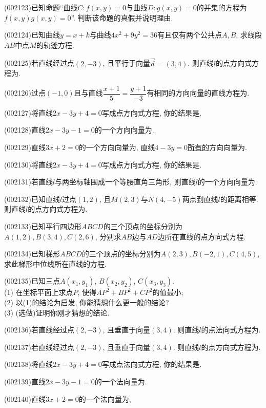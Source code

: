 \item (002123)已知命题``曲线$C:f(x,y)=0$与曲线$D:g(x,y)=0$的并集的方程为$f(x,y)g(x,y)=0$''. 判断该命题的真假并说明理由.
\item (002124)已知曲线$y=x+k$与曲线$4x^2+9y^2=36$有且仅有两个公共点$A,B$, 求线段$AB$中点$M$的轨迹方程.
\item (002125)若直线经过点$(2,-3)$, 且平行于向量$\overrightarrow{d}=(3,4)$. 则直线$l$的点方向式方程为.
\item (002126)过点$(-1,0)$且与直线$\dfrac{x+1}{5}=\dfrac{y+1}{-3}$有相同的方向向量的直线方程为.
\item (002127)将直线$2x-3y+4=0$写成点方向式方程, 你的结果是.
\item (002128)直线$2x-3y-1=0$的一个方向向量为.
\item (002129)直线$3x+2=0$的一个方向向量为,
直线$4-3y=0$\underline{所有的}方向向量为.
\item (002130)将直线$2x-3y+4=0$写成点方向式方程, 你的结果是.
\item (002131)若直线$l$与两坐标轴围成一个等腰直角三角形, 则直线$l$的一个方向向量为.
\item (002132)已知直线$l$过点$(1,2)$, 且$M(2,3)$与$N(4,-5)$两点到直线$l$的距离相等. 则直线$l$的点方向式方程为.
\item (002133)已知平行四边形$ABCD$的三个顶点的坐标分别为$A(1,2),B(3,4),C(2,6)$, 分别求$AB$边与$AD$边所在直线的点方向式方程.
\item (002134)已知梯形$ABCD$的三个顶点的坐标分别为$A(2,3),B(-2,1),C(4,5)$, 求此梯形中位线所在直线的方程.
\item (002135)已知三点$A(x_1,y_1)$, $B(x_2,y_2)$, $C(x_3,y_3)$.\\ 
(1) 在坐标平面上求点$P$, 使得$AP^2+BP^2+CP^2$的值最小;\\ 
(2) 以(1)的结论为启发, 你能猜想什么更一般的结论?\\ 
(3) (选做)证明你刚才猜想的结论.
\item (002136)若直线经过点$(2,-3)$, 且垂直于向量$(3,4)$. 则直线$l$的点法向式方程为.
\item (002137)若直线经过点$(2,-3)$, 且垂直于向量$(3,4)$. 则直线$l$的点方向式方程为.
\item (002138)将直线$2x-3y+4=0$写成点法向式方程, 你的结果是.
\item (002139)直线$2x-3y-1=0$的一个法向量为.
\item (002140)直线$3x+2=0$的一个法向量为,
